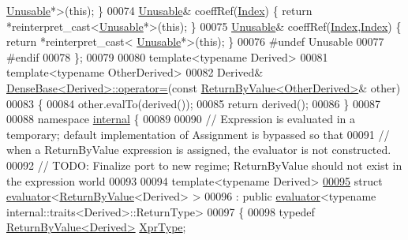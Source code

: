 \begin{DoxyCode}
      \hyperlink{class_eigen_1_1_return_by_value_1_1_unusable}{Unusable}*\textcolor{keyword}{>}(\textcolor{keyword}{this}); \}
00074     \hyperlink{class_eigen_1_1_return_by_value_1_1_unusable}{Unusable}& coeffRef(\hyperlink{namespace_eigen_a62e77e0933482dafde8fe197d9a2cfde}{Index}) \{ \textcolor{keywordflow}{return} *\textcolor{keyword}{reinterpret\_cast<}\hyperlink{class_eigen_1_1_return_by_value_1_1_unusable}{Unusable}*\textcolor{keyword}{>}(\textcolor{keyword}{this}); \}
00075     \hyperlink{class_eigen_1_1_return_by_value_1_1_unusable}{Unusable}& coeffRef(\hyperlink{namespace_eigen_a62e77e0933482dafde8fe197d9a2cfde}{Index},\hyperlink{namespace_eigen_a62e77e0933482dafde8fe197d9a2cfde}{Index}) \{ \textcolor{keywordflow}{return} *\textcolor{keyword}{reinterpret\_cast<}
      \hyperlink{class_eigen_1_1_return_by_value_1_1_unusable}{Unusable}*\textcolor{keyword}{>}(\textcolor{keyword}{this}); \}
00076 \textcolor{preprocessor}{#undef Unusable}
00077 \textcolor{preprocessor}{#endif}
00078 \};
00079 
00080 \textcolor{keyword}{template}<\textcolor{keyword}{typename} Derived>
00081 \textcolor{keyword}{template}<\textcolor{keyword}{typename} OtherDerived>
00082 Derived& \hyperlink{group___core___module_a581a7a353bd007b5352f11688e3bc5fa}{DenseBase<Derived>::operator=}(\textcolor{keyword}{const} 
      \hyperlink{group___core___module_class_eigen_1_1_return_by_value}{ReturnByValue<OtherDerived>}& other)
00083 \{
00084   other.evalTo(derived());
00085   \textcolor{keywordflow}{return} derived();
00086 \}
00087 
00088 \textcolor{keyword}{namespace }\hyperlink{namespaceinternal}{internal} \{
00089 
00090 \textcolor{comment}{// Expression is evaluated in a temporary; default implementation of Assignment is bypassed so that}
00091 \textcolor{comment}{// when a ReturnByValue expression is assigned, the evaluator is not constructed.}
00092 \textcolor{comment}{// TODO: Finalize port to new regime; ReturnByValue should not exist in the expression world}
00093   
00094 \textcolor{keyword}{template}<\textcolor{keyword}{typename} Derived>
\hyperlink{struct_eigen_1_1internal_1_1evaluator_3_01_return_by_value_3_01_derived_01_4_01_4}{00095} \textcolor{keyword}{struct }\hyperlink{struct_eigen_1_1internal_1_1evaluator}{evaluator}<\hyperlink{group___core___module_class_eigen_1_1_return_by_value}{ReturnByValue}<Derived> >
00096   : \textcolor{keyword}{public} \hyperlink{struct_eigen_1_1internal_1_1evaluator}{evaluator}<typename internal::traits<Derived>::ReturnType>
00097 \{
00098   \textcolor{keyword}{typedef} \hyperlink{group___core___module_class_eigen_1_1_return_by_value}{ReturnByValue<Derived>} \hyperlink{group___core___module_class_eigen_1_1_return_by_value}{XprType};

\end{DoxyCode}
